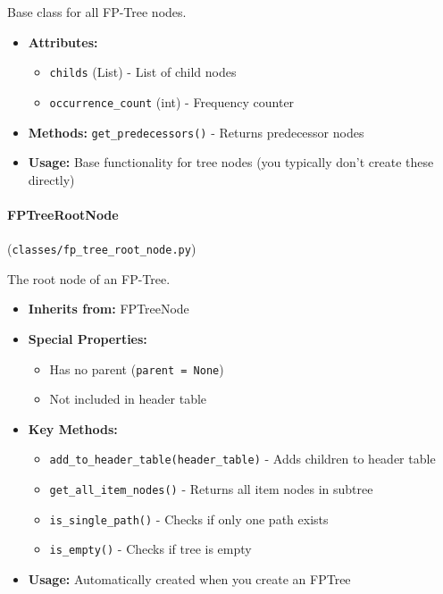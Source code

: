 \documentclass[
english,
smallborders
]{i6prcsht}
\begin{document}
Base class for all FP-Tree nodes.

\begin{itemize}
	\item \textbf{Attributes:}
	      \begin{itemize}
		      \item \texttt{childs} (List) - List of child nodes
		      \item \texttt{occurrence\_count} (int) - Frequency counter
	      \end{itemize}
	\item \textbf{Methods:} \texttt{get\_predecessors()} - Returns predecessor nodes
	\item \textbf{Usage:} Base functionality for tree nodes (you typically don't create these directly)
\end{itemize}

\vspace*{0.3cm}

\paragraph{FPTreeRootNode} (\texttt{classes/fp\_tree\_root\_node.py})

The root node of an FP-Tree.

\begin{itemize}
	\item \textbf{Inherits from:} FPTreeNode
	\item \textbf{Special Properties:}
	      \begin{itemize}
		      \item Has no parent (\texttt{parent = None})
		      \item Not included in header table
	      \end{itemize}
	\item \textbf{Key Methods:}
	      \begin{itemize}
		      \item \texttt{add\_to\_header\_table(header\_table)} - Adds children to header table
		      \item \texttt{get\_all\_item\_nodes()} - Returns all item nodes in subtree
		      \item \texttt{is\_single\_path()} - Checks if only one path exists
		      \item \texttt{is\_empty()} - Checks if tree is empty
	      \end{itemize}
	\item \textbf{Usage:} Automatically created when you create an FPTree
\end{itemize}
\end{document}
